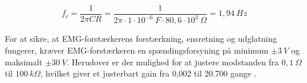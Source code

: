 \begin{equation}\label{eq:lavcutfre}
f_c = \frac{1}{2 \pi C R} = \frac{1}{2 \pi \cdot 1 \cdot 10^{-6}~F \cdot 80,6 \cdot 10^3~\Omega} = 1,94~Hz
\end{equation}

\noindent
For at sikre, at EMG-forstærkerens forstærkning, ensretning og udglatning fungerer, kræver EMG-forstærkeren en spændingsforsyning på minimum $\pm 3~V$ og maksimalt $\pm 30~V$. Herudover er der mulighed for at justere modstanden fra $0,1~\Omega$ til $100~k\Omega$, hvilket giver et justerbart gain fra 0,002 til 20.700 gange \citep{advancertech2013}. 
